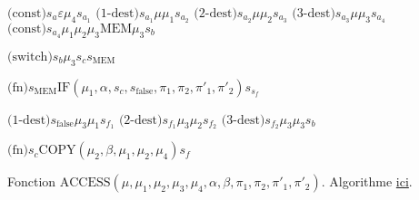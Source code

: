\documentclass{report}
\newcommand{\aramsw}[3]{\text{(switch)}	s_{#1} #2 #3} %
\newcommand{\aramconsz}[4]{\text{(const)}	s_{#1} #2 #3 s_{#4}} %
\newcommand{\aramconst}[5]{\text{(const)}	s_{#1} #2 #3 #4 s_{#5}} %
\newcommand{\aramdest}[5]{\text{(#1-dest)} 	s_{#2} #3 #4 s_{#5}} %
\newcommand{\aramfn}[3]{\text{(fn)} 		s_{#1} #2 s_{#3}}
\begin{document}
\begin{appendices}
\begin{algorithm}[H]
					\espace
					
					
					$\aramconsz{a}{\varepsilon}{\mu_4}{a_1}$ \;
					$\aramdest{$1$}{a_1}{\mu}{\mu_1}{a_2}$ \;
					$\aramdest{$2$}{a_2}{\mu}{\mu_2}{a_3}$ \;
					$\aramdest{$3$}{a_3}{\mu}{\mu_3}{a_4}$ \;
					$\aramconst{a_4}{\mu_1 \mu_2 \mu_3}{\text{MEM}}{\mu_3}{b}$ \;
					
					\espace
					
					
					$\aramsw{b}{\mu_3}{s_{c} s_{\text{MEM}}}$ \;
					
					\espace
					
					$\aramfn{\text{MEM}}{\text{IF}\left( \mu_1, \alpha, s_{c}, s_{\text{false}}, \pi_1, \pi_2, \pi'_1, \pi'_2 \right)}{s_f} $\;
					
					\espace 
														
					$\aramdest{$1$}{\text{false}}{\mu_3}{\mu_1}{f_1}$ \;
					$\aramdest{$2$}{f_1}{\mu_3}{\mu_2}{f_2}$ \;
					$\aramdest{$3$}{f_2}{\mu_3}{\mu_3}{b}$ \;
					
					\espace 

					
					$\aramfn{c}{\text{COPY}\left( \mu_2, \beta, \mu_1, \mu_2, \mu_4 \right)}{f}$ \;
					
					\caption{Fonction $\text{ACCESS}\left( \mu, \mu_1, \mu_2, \mu_3, \mu_4, \alpha, \beta, \pi_1, \pi_2, \pi'_1, \pi'_2\right)$. Algorithme \hyperref[algo:A_RAM_fn_ACCESS]{ici}. }
				\end{algorithm}
				
				\espace
				
				
				
			\end{appendices}
			
			
			
			
			
			
			
			
\end{document}

